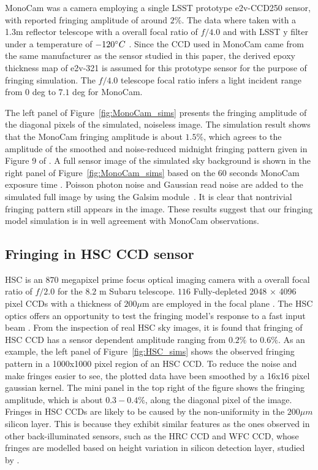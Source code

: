 \documentclass[twocolumn]{aastex63} %
\begin{document}
\begin{CJK*}{UTF8}{gbsn}
MonoCam was a camera employing a single LSST prototype e2v-CCD250 sensor, with reported fringing amplitude of around $2\%$. The data where taken with a 1.3m reflector telescope with a overall focal ratio of $f/4.0$ and with LSST y filter under a temperature of $-120\degree C$ \citep{Brooks17}. Since the CCD used in MonoCam came from the same manufacturer as the sensor studied in this paper, the derived epoxy thickness map of e2v-321 is assumed for this prototype sensor for the purpose of fringing simulation. The $f/4.0$ telescope focal ratio infers a light incident range from $0$ deg to $7.1$ deg for MonoCam.

The left panel of Figure~\ref{fig:MonoCam_sims} presents the fringing amplitude of the diagonal pixels of the simulated, noiseless image. The simulation result shows that the MonoCam fringing amplitude is about $1.5\%$, which agrees to the amplitude of the smoothed and noise-reduced midnight fringing pattern given in Figure 9 of \citet{Brooks17}. A full sensor image of the simulated sky background is shown in the right panel of Figure~\ref{fig:MonoCam_sims} based on the $60$ seconds MonoCam exposure time \citep{Brooks17}. Poisson photon noise and Gaussian read noise are added to the simulated full image by using the Galsim module~\citep{Galsim}. It is clear that nontrivial fringing pattern still appears in the image. These results suggest that our fringing model simulation is in well agreement with MonoCam observations.

\subsection{Fringing in HSC CCD sensor}

HSC is an $870$ megapixel prime focus optical imaging camera with a overall focal ratio of $f/2.0$ for the $8.2$ m Subaru telescope. $116$ Fully-depleted  2048 × 4096 pixel CCDs with a thickness of $200\mu$m are employed in the focal plane \citep{Miyazaki18}. The HSC optics offers an opportunity to test the fringing model's response to a fast input beam . From the inspection of real HSC sky images, it is found that fringing of HSC CCD has a sensor dependent amplitude ranging from $0.2\%$ to $0.6\%$. As an example, the left panel of Figure~\ref{fig:HSC_sims} shows the observed fringing pattern in a 1000x1000 pixel region of an HSC CCD. To reduce the noise and make fringes easier to see, the plotted data have been smoothed by a 16x16 pixel gaussian kernel. The mini panel in the top right of the figure shows the fringing amplitude, which is about $0.3-0.4\%$, along the diagonal pixel of the image. Fringes in HSC CCDs are likely to be caused by the non-uniformity in the $200\mu m$ silicon layer. This is because they exhibit similar features as the ones observed in other back-illuminated sensors, such as the HRC CCD and WFC CCD, whose fringes are modelled based on height variation in silicon detection layer, studied by \citet{Walsh03}. 


\end{CJK*}
\end{document}
